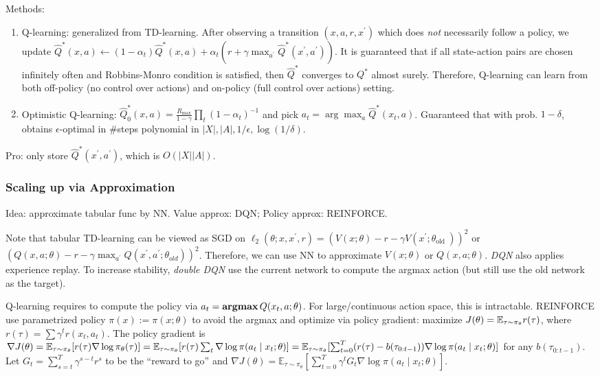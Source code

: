 Methods:
\begin{enumerate}
    \item Q-learning: generalized from TD-learning. After observing a transition $(x,a,r,x^\prime)$ which does \emph{not} necessarily follow a policy, we update $\hat{Q}^{*}(x, a) \leftarrow\left(1-\alpha_{t}\right) \hat{Q}^{*}(x, a)+\alpha_{t}\left(r+\gamma \max _{a^{\prime}} \hat{Q}^{*}\left(x^{\prime}, a^{\prime}\right)\right)$. It is guaranteed that if all state-action pairs are chosen infinitely often and Robbins-Monro condition is satisfied, then $\hat{Q}^{*}$ converges to $Q^*$ almost surely. Therefore, Q-learning can learn from both off-policy (no control over actions) and on-policy (full control over actions) setting.
    \item Optimistic Q-learning: $\hat{Q}_0^{*}(x, a)=\frac{R_{\max }}{1-\gamma} \prod_{t}\left(1-\alpha_{t}\right)^{-1}$ and pick $a_{t} = \arg \max _{a} \hat{Q}^{*}\left(x_{t}, a\right)$. Guaranteed that with prob. $1-\delta$, obtains $\epsilon$-optimal in \#steps polynomial in $|X|,|A|,1/\epsilon,\log(1/\delta)$.
\end{enumerate}

Pro: only store $\hat{Q}^{*}\left(x^{\prime}, a^{\prime}\right)$, which is $O(|X||A|)$.

\subsubsection*{Scaling up via Approximation}

Idea: approximate tabular func by NN. Value approx: DQN; Policy approx: REINFORCE.

Note that tabular TD-learning can be viewed as SGD on $\ell_{2}\left(\theta ; x, x^{\prime}, r\right)=\left(V(x ; \theta)-r-\gamma V\left(x^{\prime} ; \theta_{\text {old }}\right)\right)^{2}$ or $\left(Q(x, a ; \theta)-r-\gamma \max _{a^{\prime}} Q\left(x^{\prime}, a^{\prime} ; \theta_{o l d}\right)\right)^{2}$. Therefore, we can use NN to approximate $V(x;\theta)$ or $Q(x,a;\theta)$. \emph{DQN} also applies experience replay. To increase stability, \emph{double DQN} use the current network to compute the argmax action (but still use the old network as the target).

Q-learning requires to compute the policy via $a_t=\operatorname{\textbf{argmax}} Q(x_t,a;\theta)$. For large/continuous action space, this is intractable. REINFORCE use parametrized policy $\pi(x):=\pi(x;\theta)$ to avoid the argmax and optimize via policy gradient:
 maximize $J(\theta) = \mathbb{E}_{\tau \sim\pi_\theta} r(\tau)$, where $r(\tau)=\sum \gamma^t r(x_t,a_t)$. The policy gradient is $\nabla J(\theta)=\mathbb{E}_{\tau\sim \pi_\theta} [r(\tau)\nabla \log \pi_\theta(\tau)] = \mathbb{E}_{\tau\sim\pi_\theta} [r(\tau)\sum_t \nabla \log \pi(a_t\mid x_t;\theta)] = \mathbb{E}_{\tau\sim\pi_\theta} [\sum_{t=0}^T (r(\tau)-b(\tau_{0:t-1})) \nabla \log \pi(a_t\mid x_t;\theta)]$ for any $b(\tau_{0:t-1})$. Let $G_t=\sum_{s=t}^T \gamma^{s-t} r^s$ to be the ``reward to go'' and $\nabla J(\theta)=\mathbb{E}_{\tau \sim \pi_{\theta}}\left[\sum_{t=0}^{T} \gamma^{t} G_{t} \nabla \log \pi\left(a_{t} \mid x_{t} ; \theta\right)\right]$.

